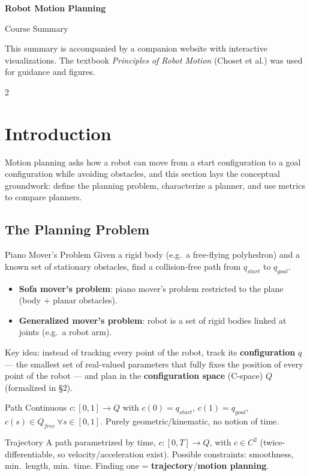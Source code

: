 \documentclass[10pt,a4paper]{article}
\newcommand{\keyterm}[1]{\textbf{#1}}
\begin{document}
\begin{center}
{\huge\bfseries Robot Motion Planning}

{\Large Course Summary}

{\small This summary is accompanied by a companion website with interactive visualizations. The textbook \emph{Principles of Robot Motion} (Choset et al.) was used for guidance and figures.}

{\small}
\end{center}
\vspace{6pt}

\raggedcolumns
\begin{multicols}{2}

\section{Introduction}

Motion planning asks how a robot can move from a start configuration to a goal configuration while avoiding obstacles, and this section lays the conceptual groundwork: define the planning problem, characterize a planner, and use metrics to compare planners.

\subsection{The Planning Problem}

\begin{defbox}{Piano Mover's Problem}
Given a rigid body (e.g.\ a free-flying polyhedron) and a known set of stationary obstacles, find a collision-free path from $q_{start}$ to $q_{goal}$.
\end{defbox}
\begin{itemize}
\item \keyterm{Sofa mover's problem}: piano mover's problem restricted to the plane (body + planar obstacles).
\item \keyterm{Generalized mover's problem}: robot is a set of rigid bodies linked at joints (e.g.\ a robot arm).
\end{itemize}

Key idea: instead of tracking every point of the robot, track its \keyterm{configuration} $q$ --- the smallest set of real-valued parameters that fully fixes the position of every point of the robot --- and plan in the \keyterm{configuration space} (C-space) $Q$ (formalized in \S2).

\begin{defbox}{Path}
Continuous $c:[0,1]\to Q$ with $c(0)=q_{start}$, $c(1)=q_{goal}$, $c(s)\in Q_{free}\ \forall s\in[0,1]$. Purely geometric/kinematic, no notion of time.
\end{defbox}
\begin{defbox}{Trajectory}
A path parametrized by time, $c:[0,T]\to Q$, with $c\in C^2$ (twice-differentiable, so velocity/acceleration exist). Possible constraints: smoothness, min.\ length, min.\ time. Finding one = \keyterm{trajectory}/\keyterm{motion planning}.
\end{defbox}


\end{multicols}
\end{document}

